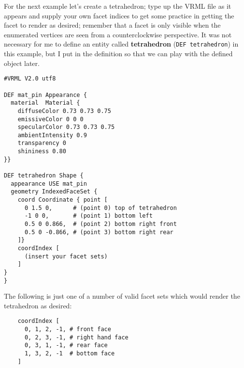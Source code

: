 \documentclass[a4paper]{article}
\begin{document}
For the next example let's create a tetrahedron; type up the VRML file as it appears and supply your own facet
indices to get some practice in getting the facet to render as desired; remember that a facet is only visible
when the enumerated vertices are seen from a counterclockwise perspective. It was not necessary for me to
define an entity called \textbf{tetrahedron} (\verb~DEF tetrahedron~) in this example, but I put in the definition
so that we can play with the defined object later.

\begin{verbatim}
#VRML V2.0 utf8

DEF mat_pin Appearance {
  material  Material {
    diffuseColor 0.73 0.73 0.75
    emissiveColor 0 0 0
    specularColor 0.73 0.73 0.75
    ambientIntensity 0.9
    transparency 0
    shininess 0.80
}}

DEF tetrahedron Shape {
  appearance USE mat_pin
  geometry IndexedFaceSet {
    coord Coordinate { point [
      0 1.5 0,      # (point 0) top of tetrahedron
      -1 0 0,       # (point 1) bottom left
      0.5 0 0.866,  # (point 2) bottom right front
      0.5 0 -0.866, # (point 3) bottom right rear
    ]}
    coordIndex [
      (insert your facet sets)
    ]
}
}
\end{verbatim}

The following is just one of a number of valid facet sets which would render the tetrahedron as desired:

\begin{verbatim}
    coordIndex [
      0, 1, 2, -1, # front face
      0, 2, 3, -1, # right hand face
      0, 3, 1, -1, # rear face
      1, 3, 2, -1  # bottom face
    ]
\end{verbatim}
\end{document}
